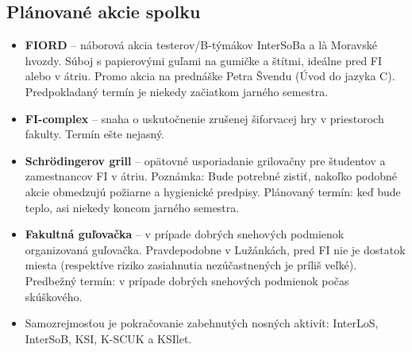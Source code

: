 \documentclass[11pt,a4paper]{article}
\begin{document}
\subsection*{Plánované akcie spolku}
\begin{itemize}[itemsep=0pt]
\item \textbf{FIORD} -- náborová akcia testerov/B-týmákov InterSoBa a l\`{a} Moravské hvozdy. Súboj s papierovými guľami na gumičke a štítmi, ideálne pred FI alebo v átriu. Promo akcia na prednáške Petra Švendu (Úvod do jazyka C). Predpokladaný termín je niekedy začiatkom jarného semestra.
\item \textbf{FI-complex} -- snaha o uskutočnenie zrušenej šiforvacej hry v priestoroch fakulty. Termín ešte nejasný.
\item \textbf{Schrödingerov grill} -- opätovné usporiadanie grilovačny pre študentov a zamestnancov FI v átriu. Poznámka: Bude potrebné zistiť, nakoľko podobné akcie obmedzujú požiarne a hygienické predpisy. Plánovaný termín: keď bude teplo, asi niekedy koncom jarného semestra.
\item \textbf{Fakultná guľovačka} -- v prípade dobrých snehových podmienok organizovaná guľovačka. Pravdepodobne v Lužánkách, pred FI nie je dostatok miesta (respektíve riziko zasiahnutia nezúčastnených je príliš veľké). Predbežný termín: v prípade dobrých snehových podmienok počas skúškového.
\item Samozrejmosťou je pokračovanie zabehnutých nosných aktivít: InterLoS, InterSoB, KSI, K-SCUK a KSIlet.
\end{itemize}
\end{document}
